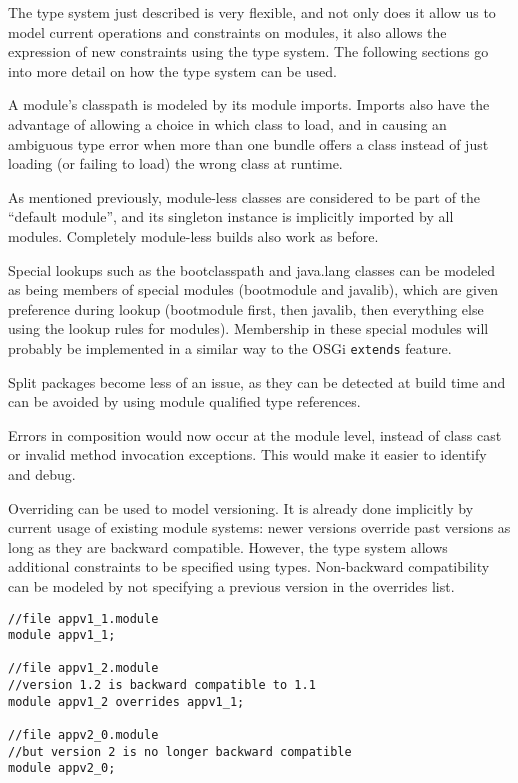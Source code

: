 The type system just described is very flexible, and not only does it
allow us to model current operations and constraints on modules, it also
allows the expression of new constraints using the type system. The following
sections go into more detail on how the type system can be used.


A module's classpath is modeled by its module imports. Imports also have the advantage
of allowing a choice in which class to load, and in causing an
ambiguous type error  when more than one bundle offers
a class instead of just loading (or failing to load) the wrong class at runtime.

As mentioned previously, module-less classes are considered to be part 
of the ``default module'', and its singleton instance is implicitly 
imported by all modules. Completely module-less builds also work as before.

Special lookups such as the bootclasspath and java.lang classes can be
modeled as being members of special modules (bootmodule and javalib), 
which are given preference during lookup (bootmodule first, then javalib,
then everything else using the lookup rules for modules). Membership
in these special modules will probably be implemented in a similar way to
the OSGi \texttt{extends} feature.

Split packages become less of an issue, as they can be detected at
build time and can be avoided by using module qualified type references.

Errors in composition would now occur at the module level, instead of
class cast or invalid method invocation exceptions. This would make it
easier to identify and debug.


Overriding can be used to model versioning. It is already done
implicitly by current usage of existing module systems: newer versions  
override past versions as long as they are backward compatible.
However, the type system allows additional constraints to be specified using
types. Non-backward compatibility can be modeled by not specifying a
previous version in the overrides list.

\begin{lstlisting}[caption=Versioning Using Overrides]
//file appv1_1.module
module appv1_1;

//file appv1_2.module
//version 1.2 is backward compatible to 1.1
module appv1_2 overrides appv1_1;

//file appv2_0.module
//but version 2 is no longer backward compatible
module appv2_0; 
\end{lstlisting}


